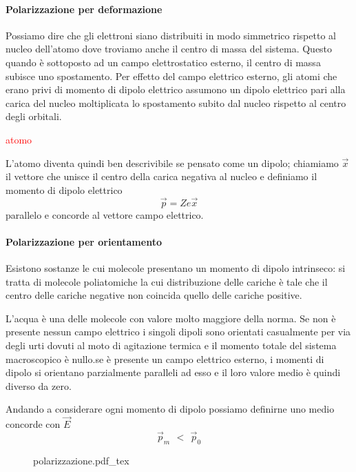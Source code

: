 \documentclass[x11names]{report}
\newcommand{\incfig}[1]{%
	{#1.pdf_tex}
}
\begin{document}
\paragraph*{Polarizzazione per deformazione}
Possiamo dire che gli elettroni siano distribuiti in modo simmetrico rispetto al nucleo dell'atomo dove troviamo anche il centro di massa del sistema. Questo quando è sottoposto ad un campo elettrostatico esterno, il centro di massa subisce uno spostamento. Per effetto del campo elettrico esterno, gli atomi che erano privi di momento di dipolo elettrico assumono un dipolo elettrico pari alla carica del nucleo moltiplicata lo spostamento subito dal nucleo rispetto al centro degli orbitali.

\begin{center}
	\textcolor{red}{atomo}
\end{center}

L'atomo diventa quindi ben descrivibile se pensato come un dipolo; chiamiamo \(\vec{x}\) il vettore che unisce il centro della carica negativa al nucleo e definiamo il momento di dipolo elettrico
\[
\vec{p} = Z e \vec{x}
\]
parallelo e concorde al vettore campo elettrico.

\paragraph*{Polarizzazione per orientamento} 
Esistono sostanze le cui molecole presentano un momento di dipolo intrinseco: si tratta di molecole poliatomiche la cui distribuzione delle cariche è tale che il centro delle cariche negative non coincida quello delle cariche positive. 

L'acqua è una delle molecole con valore molto maggiore della norma. Se non è presente nessun campo elettrico i singoli dipoli sono orientati casualmente per via degli urti dovuti al moto di agitazione termica e il momento totale del sistema macroscopico è nullo.se è presente un campo elettrico esterno, i momenti di dipolo si orientano parzialmente paralleli ad esso e il loro valore medio è quindi diverso da zero.

Andando a considerare ogni momento di dipolo possiamo definirne uno medio concorde con \(\vec{E}\)
\[
\vec{p}_m \,\ < \,\ \vec{p}_0
\]

\begin{figure}[H]
	\centering
	\incfig{polarizzazione}
\end{figure}
 
\end{document}
